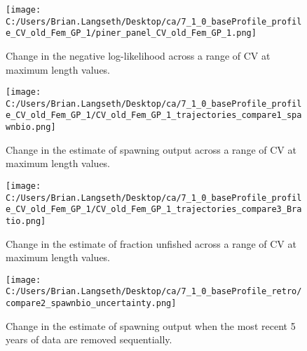 \documentclass[11pt,
  english,
  a4paper,
]{article}
\begin{document}
\tagmcend\tagstructend


\begin{figure}
\centering
\texttt{[image: C:/Users/Brian.Langseth/Desktop/ca/7\_1\_0\_baseProfile\_profile\_CV\_old\_Fem\_GP\_1/piner\_panel\_CV\_old\_Fem\_GP\_1.png]}
\caption{Change in the negative log-likelihood across a range of CV at maximum length values.\label{fig:cv2-profile}}
\end{figure}

\tagmcend\tagstructend


\begin{figure}
\centering
\texttt{[image: C:/Users/Brian.Langseth/Desktop/ca/7\_1\_0\_baseProfile\_profile\_CV\_old\_Fem\_GP\_1/CV\_old\_Fem\_GP\_1\_trajectories\_compare1\_spawnbio.png]}
\caption{Change in the estimate of spawning output across a range of CV at maximum length values.\label{fig:cv2-ssb}}
\end{figure}

\tagmcend\tagstructend


\begin{figure}
\centering
\texttt{[image: C:/Users/Brian.Langseth/Desktop/ca/7\_1\_0\_baseProfile\_profile\_CV\_old\_Fem\_GP\_1/CV\_old\_Fem\_GP\_1\_trajectories\_compare3\_Bratio.png]}
\caption{Change in the estimate of fraction unfished across a range of CV at maximum length values.\label{fig:cv2-depl}}
\end{figure}

\tagmcend\tagstructend


\begin{figure}
\centering
\texttt{[image: C:/Users/Brian.Langseth/Desktop/ca/7\_1\_0\_baseProfile\_retro/compare2\_spawnbio\_uncertainty.png]}
\caption{Change in the estimate of spawning output when the most recent 5 years of data are removed sequentially.\label{fig:retro-ssb}}
\end{figure}
\end{document}
